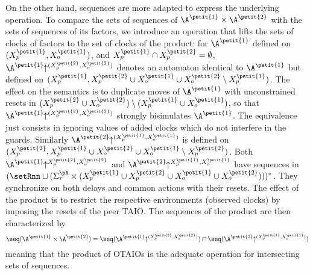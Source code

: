 \documentclass{LMCS}
\theoremstyle{plain}\newtheorem{proposition}[thm]{Proposition}
\begin{document}
On the other hand, sequences are more adapted to express the underlying operation.
 To compare the sets of sequences of
  $\A^{\petit{1}} \times \A^{\petit{2}}$ with the sets of sequences of
  its factors, we introduce an operation that lifts the sets of clocks
  of factors to the set of clocks of the product: for $\A^{\petit{1}}$
  defined on $(X_p^{\petit{1}},X_o^{\petit{1}})$, and $X_p^{\petit{1}}
  \cap X_p^{\petit{2}}= \emptyset$,
  $\A^{\petit{1}}\!\!\uparrow^{(X^{\petit{2}}_p,X^{\petit{2}}_o)}$ denotes
  an automaton identical to $\A^{\petit{1}}$
  but defined on
  $(X_p^{\petit{1}},X_p^{\petit{2}}\cup X_o^{\petit{1}} \cup
  X_o^{\petit{2}}\setminus X_p^{\petit{1}})$.  The effect on the semantics is to
  duplicate moves of $\A^{\petit{1}}$ with unconstrained resets in
  $(X_p^{\petit{2}}\cup X_o^{\petit{2}}) \setminus  (X_p^{\petit{1}}\cup
  X_o^{\petit{1}})$, so that
  $\A^{\petit{1}}\!\!\uparrow^{(X^{\petit{2}}_p,X^{\petit{2}}_o)}$
  strongly bisimulates $\A^{\petit{1}}$.  
  The equivalence just consists in ignoring values of added clocks which do not interfere in the guards.
  Similarly
  $\A^{\petit{2}}\!\!\uparrow^{(X^{\petit{1}}_p,X^{\petit{1}}_o)}$ is
  defined on $(X_p^{\petit{2}},X_p^{\petit{1}}\cup X_o^{\petit{2}}
  \cup X_o^{\petit{1}}\setminus X_p^{\petit{2}})$.  
  Both
  $\A^{\petit{1}}\!\!\uparrow^{X^{\petit{2}}_p,X^{\petit{2}}_o}$ and
  $\A^{\petit{2}}\!\!\uparrow^{X^{\petit{1}}_p,X^{\petit{1}}_o}$ have
  sequences in
  $(\setRnn \sqcup (\Sigma_\tau^\pA \times (X_p^{\petit{1}} \cup X_p^{\petit{2}} \cup X_o^{\petit{1}} \cup X_o^{\petit{2}})))^*$. They synchronize on both delays and common actions with their resets.
The effect of the product is to restrict the respective environments  (observed clocks) 
by imposing the resets of the peer TAIO. 
The sequences of the product  are then characterized by\\
\begin{equation}
\label{eq-seq}
\seq(\A^{\petit{1}} \times \A^{\petit{2}}) =
  \seq(\A^{\petit{1}}\!\!\uparrow^{(X^{\petit{2}}_p,X^{\petit{2}}_o)})
  \cap
  \seq(\A^{\petit{2}}\!\!\uparrow^{(X^{\petit{1}}_p,X^{\petit{1}}_o)})
\end{equation}
 meaning that the product of OTAIOs is the adequate operation for
intersecting sets of sequences. 


\end{document}

